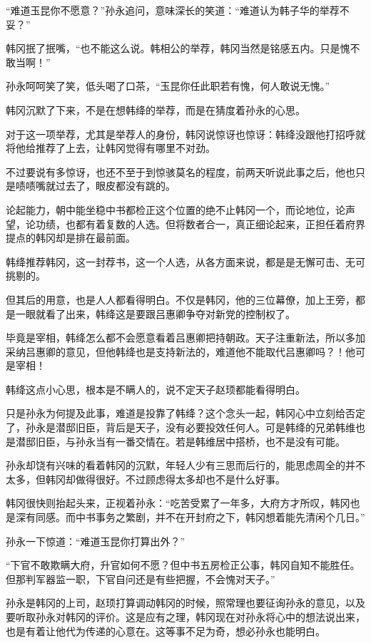 “难道玉昆你不愿意？”孙永追问，意味深长的笑道：“难道认为韩子华的举荐不妥？”

韩冈抿了抿嘴，“也不能这么说。韩相公的举荐，韩冈当然是铭感五内。只是愧不敢当啊！”

孙永呵呵笑了笑，低头喝了口茶，“玉昆你任此职若有愧，何人敢说无愧。”

韩冈沉默了下来，不是在想韩绛的举荐，而是在猜度着孙永的心思。

对于这一项举荐，尤其是举荐人的身份，韩冈说惊讶也惊讶：韩绛没跟他打招呼就将他给推荐了上去，让韩冈觉得有哪里不对劲。

不过要说有多惊讶，也还不至于到惊骇莫名的程度，前两天听说此事之后，他也只是啧啧嘴就过去了，眼皮都没有跳的。

论起能力，朝中能坐稳中书都检正这个位置的绝不止韩冈一个，而论地位，论声望，论功绩，也都有着复数的人选。但将数者合一，真正细论起来，正担任着府界提点的韩冈却是排在最前面。

韩绛推荐韩冈，这一封荐书，这一个人选，从各方面来说，都是是无懈可击、无可挑剔的。

但其后的用意，也是人人都看得明白。不仅是韩冈，他的三位幕僚，加上王旁，都是一眼就看了出来，韩绛这是要跟吕惠卿争夺对新党的控制权了。

毕竟是宰相，韩绛怎么都不会愿意看着吕惠卿把持朝政。天子注重新法，所以多加采纳吕惠卿的意见，但他韩绛也是支持新法的，难道他不能取代吕惠卿吗？！他可是宰相！

韩绛这点小心思，根本是不瞒人的，说不定天子赵顼都能看得明白。

只是孙永为何提及此事，难道是投靠了韩绛？这个念头一起，韩冈心中立刻给否定了，孙永是潜邸旧臣，背后是天子，没有必要投效任何人。可是韩绛的兄弟韩维也是潜邸旧臣，与孙永当有一番交情在。若是韩维居中搭桥，也不是没有可能。

孙永却饶有兴味的看着韩冈的沉默，年轻人少有三思而后行的，能思虑周全的并不太多，但韩冈却做得很好。不过顾虑得太多却也不是什么好事。

韩冈很快则抬起头来，正视着孙永：“吃苦受累了一年多，大府方才所叹，韩冈也是深有同感。而中书事务之繁剧，并不在开封府之下，韩冈想着能先清闲个几日。”

孙永一下惊道：“难道玉昆你打算出外？”

“下官不敢欺瞒大府，升官如何不愿？但中书五房检正公事，韩冈自知不能胜任。但那判军器监一职，下官自问还是有些把握，不会愧对天子。”

孙永是韩冈的上司，赵顼打算调动韩冈的时候，照常理也要征询孙永的意见，以及要听取孙永对韩冈的评价。这是应有之理，韩冈现在对孙永将心中的想法说出来，也是有着让他代为传递的心意在。这等事不足为奇，想必孙永也能明白。

